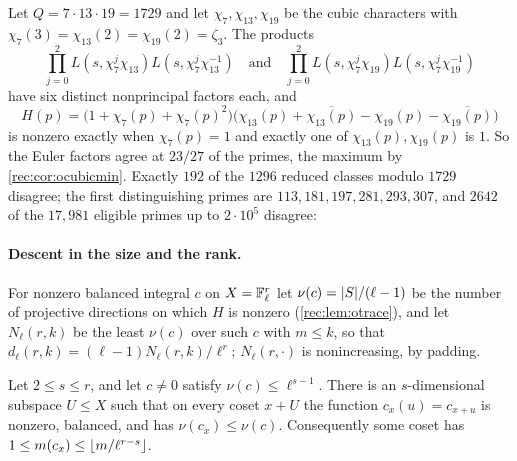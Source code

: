\begin{example}\label{rec:ex:ocubic}
Let $Q=7\cdot13\cdot19=1729$ and let $\chi_7,\chi_{13},\chi_{19}$ be the cubic characters with $\chi_7(3)=\chi_{13}(2)=\chi_{19}(2)=\zeta_3$.
The products
\[
 \prod_{j=0}^2L(s,\chi_7^j\chi_{13})L(s,\chi_7^j\chi_{13}^{-1})\quad\text{and}\quad\prod_{j=0}^2L(s,\chi_7^j\chi_{19})L(s,\chi_7^j\chi_{19}^{-1})
\]
have six distinct nonprincipal factors each, and
\[
 H(p)=\bigl(1+\chi_7(p)+\chi_7(p)^2\bigr)\bigl(\chi_{13}(p)+\overline{\chi_{13}(p)}-\chi_{19}(p)-\overline{\chi_{19}(p)}\bigr)
\]
is nonzero exactly when $\chi_7(p)=1$ and
exactly one of $\chi_{13}(p),\chi_{19}(p)$ is $1$. So the Euler factors agree at $23/27$ of the primes, the maximum by
\cref{rec:cor:ocubicmin}. Exactly $192$ of the $1296$ reduced classes modulo $1729$ disagree; the first
distinguishing primes are $113,181,197,281,293,307$, and $2642$ of the $17{,}981$ eligible primes up to $2\cdot10^5$
disagree:
\begin{center}
\end{center}
\end{example}

\paragraph{Descent in the size and the rank.}
For nonzero balanced integral $c$ on $X=\mathbb{F}_\ell^r$ let $\nu(c)=\lvert S\rvert/(\ell-1)$ be the number of projective directions on
which $H$ is nonzero (\cref{rec:lem:otrace}), and let $N_\ell(r,k)$ be the least $\nu(c)$ over such $c$ with $m\le k$, so that
$d_\ell(r,k)=(\ell-1)N_\ell(r,k)/\ell^r$; $N_\ell(r,\cdot)$ is nonincreasing, by padding.

\begin{lemma}\label{rec:lem:oslice}
Let $2\le s\le r$, and let $c\ne0$ satisfy $\nu(c)\le\ell^{s-1}$. There is an $s$-dimensional subspace $U\le X$ such that on every
coset $x+U$ the function $c_x(u)=c_{x+u}$ is nonzero, balanced, and has $\nu(c_x)\le\nu(c)$. Consequently some coset has
$1\le m(c_x)\le\lfloor m/\ell^{r-s}\rfloor$.
\end{lemma}

